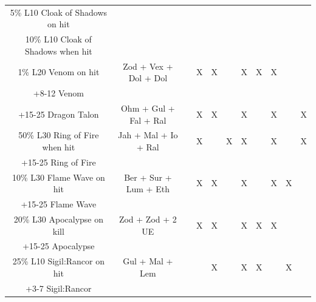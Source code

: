 \documentclass[12pt,a4paper]{article}
\begin{document}
\begin{center}
{\begin{tabular}{|c|c|c|c|c|c|c|c|c|c|c|}
5\% L10 Cloak of Shadows on hit&&&&&&&&&&\\
10\% L10 Cloak of Shadows when hit&&&&&&&&&&\\
\hline
1\% L20 Venom on hit&Zod + Vex + Dol + Dol&&X&X&&X&X&X&&\\
+8-12 Venom&&&&&&&&&&\\
\hline
+15-25 Dragon Talon&Ohm + Gul + Fal + Ral&&X&X&&X&&X&&X\\
\hline
50\% L30 Ring of Fire when hit&Jah + Mal + Io + Ral&&X&&X&X&&X&&X\\
+15-25 Ring of Fire&&&&&&&&&&\\
\hline
10\% L30 Flame Wave on hit&Ber + Sur + Lum + Eth&&X&X&&X&&X&X&\\
+15-25 Flame Wave&&&&&&&&&&\\
\hline
20\% L30 Apocalypse on kill&Zod + Zod + 2 UE&&X&X&&X&X&X&&\\
+15-25 Apocalypse&&&&&&&&&&\\
\hline
25\% L10 Sigil:Rancor on hit&Gul + Mal + Lem&&&X&&X&X&&X&\\
+3-7 Sigil:Rancor&&&&&&&&&&\\
\hline
\end{tabular}
}
\end{center}
\end{document}
